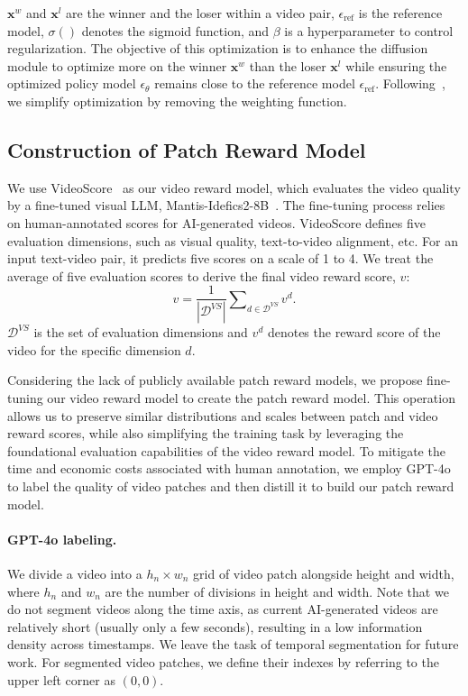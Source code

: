 $\mathbf{x}^w$ and $\mathbf{x}^l$ are the winner and the loser within a video pair, $\epsilon_{\text{ref}}$ is the reference model, $\sigma()$ denotes the sigmoid function, and $\beta$ is a hyperparameter to control regularization. The objective of this optimization is to enhance the diffusion module to optimize more on the winner $\mathbf{x}^w$ than the loser $\mathbf{x}^l$ while ensuring the optimized policy model $\epsilon_\theta$ remains close to the reference model $\epsilon_{\text{ref}}$. Following~\cite{DM2}, we simplify optimization by removing the weighting function.

\subsection{Construction of Patch Reward Model}\label{sec:rw}
We use VideoScore~\cite{VideoScore} as our video reward model, which evaluates the video quality by a fine-tuned visual LLM, Mantis-Idefics2-8B~\cite{mantis}. The fine-tuning process relies on human-annotated scores for AI-generated videos. VideoScore defines five evaluation dimensions, such as visual quality, text-to-video alignment, etc. For an input text-video pair, it predicts five scores on a scale of 1 to 4. We treat the average of five evaluation scores to derive the final video reward score, $v$:
\begin{equation}
    v = \frac{1}{|\mathcal{D}^{VS}|}\sum\nolimits_{d\in\mathcal{D}^{VS}}v^d.
    \label{eq:rw_avg}
\end{equation}
$\mathcal{D}^{VS}$ is the set of evaluation dimensions and $v^d$ denotes the reward score of the video for the specific dimension $d$.

Considering the lack of publicly available patch reward models, we propose fine-tuning our video reward model to create the patch reward model. This operation allows us to preserve similar distributions and scales between patch and video reward scores, while also simplifying the training task by leveraging the foundational evaluation capabilities of the video reward model. To mitigate the time and economic costs associated with human annotation, we employ GPT-4o~\cite{GPT-4} to label the quality of video patches and then distill it to build our patch reward model.  

\paragraph{GPT-4o labeling.} We divide a video into a $h_n\times w_n$ grid of video patch alongside height and width, where $h_n$ and $w_n$ are the number of divisions in height and width. Note that we do not segment videos along the time axis, as current AI-generated videos are relatively short (usually only a few seconds), resulting in a low information density across timestamps. We leave the task of temporal segmentation for future work. For segmented video patches, we define their indexes by referring to the upper left corner as $(0,0)$.

